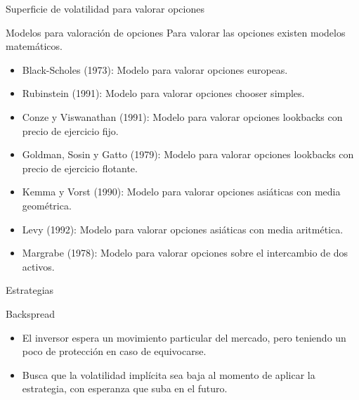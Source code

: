 \documentclass{beamer}
\begin{document}
\begin{frame}{Superficie de volatilidad para valorar opciones}

  \begin{block}{Modelos para valoraci\'on de opciones}
  Para valorar las opciones existen modelos matem\'aticos.
  \end{block}
    \begin{itemize}
      \item Black-Scholes (1973): Modelo para valorar opciones europeas.
      \item Rubinstein (1991): Modelo para valorar opciones chooser simples.
      \item Conze y Viswanathan (1991): Modelo para valorar opciones lookbacks con precio de ejercicio fijo.
      \item Goldman, Sosin y Gatto (1979): Modelo para valorar opciones lookbacks con precio de ejercicio flotante.
      \item Kemma y Vorst (1990): Modelo para valorar opciones asi\'aticas con media geom\'etrica.
      \item Levy (1992): Modelo para valorar opciones asi\'aticas con media aritm\'etica.
      \item Margrabe (1978): Modelo para valorar opciones sobre el intercambio de dos activos.
    \end{itemize}


\end{frame}


\begin{frame}{Estrategias}


   \begin{block}{Backspread}

        \begin{itemize}

            \item El inversor espera un movimiento particular del mercado, pero teniendo un poco de protecci\'on en caso de equivocarse.
            \item Busca que la volatilidad impl\'icita sea baja al momento de aplicar la estrategia, con esperanza que suba en el futuro.

        \end{itemize}

    \end{block}

\end{frame}
\end{document}
